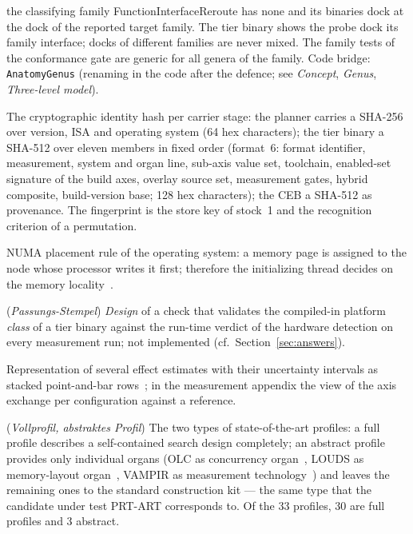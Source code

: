 \begin{description}
  the classifying family FunctionInterfaceReroute has none and its binaries dock at the dock of the
  reported target family. The tier binary shows the probe dock its family interface; docks of different
  families are never mixed. The family tests of the conformance gate are generic for all genera of the
  family. Code bridge: \texttt{AnatomyGenus} (renaming in the code after the defence; see
  \emph{Concept}, \emph{Genus}, \emph{Three-level model}).
  \item[Fingerprint] The cryptographic identity hash per carrier stage: the planner carries a
  SHA-256 over version, ISA and operating system (64 hex characters); the tier binary a SHA-512
  over eleven members in fixed order (format~6: format identifier, measurement, system and organ
  line, sub-axis value set, toolchain, enabled-set signature of the build axes, overlay source set,
  measurement gates, hybrid composite, build-version base; 128 hex characters); the CEB a SHA-512
  as provenance. The fingerprint is the store key of stock~1 and the recognition criterion of a
  permutation.
  \item[First-touch policy] NUMA placement rule of the operating system: a memory page is assigned
  to the node whose processor writes it first; therefore the initializing thread decides on the
  memory locality~\cite{lameter2013numa}.
  \item[Fit stamp] (\emph{Passungs-Stempel}) \emph{Design} of a check that validates the
  compiled-in platform \emph{class} of a tier binary against the run-time verdict of the hardware
  detection on every measurement run; not implemented (cf.\ Section~\ref{sec:answers}).
  \item[Forest plot] Representation of several effect estimates with their uncertainty intervals as
  stacked point-and-bar rows~\cite{lewis2001forest}; in the measurement appendix the view of the
  axis exchange per configuration against a reference.
  \item[Full profile, abstract profile] (\emph{Vollprofil, abstraktes Profil}) The two types of
  state-of-the-art profiles: a full profile describes a self-contained search design completely; an
  abstract profile provides only individual organs (OLC as concurrency
  organ~\cite{leis2016olc}, LOUDS as memory-layout organ~\cite{jacobson1989louds}, VAMPIR as
  measurement technology~\cite{berthold2023vampir}) and leaves the remaining ones to the standard
  construction kit --- the same type that the candidate under test PRT-ART corresponds to. Of the 33 profiles,
  30 are full profiles and 3 abstract.

\end{description}
